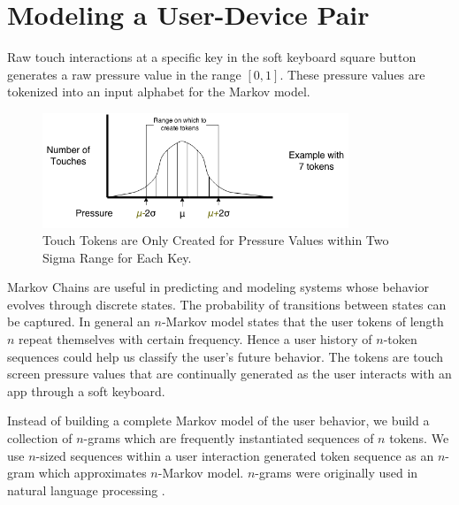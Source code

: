 \documentclass{acm_proc_article-sp}
\begin{document}
\section{Modeling a User-Device Pair}
\label{sec:modeling}
Raw touch interactions at a specific key in the soft keyboard square button
generates a raw pressure value in the range $[0,1]$. These pressure values are tokenized
into an input alphabet for the Markov model.
 
 \begin{figure}
\centering
\includegraphics[width=3.6in]{token_creation.png}
\caption{Touch Tokens are Only Created for Pressure Values within Two Sigma Range for Each Key.}
\label{fig:token_creation}
\end{figure}


Markov Chains are useful in predicting and modeling systems whose behavior evolves through discrete states. The probability of transitions between states can be captured.
In general an $n$-Markov model states that the
user tokens of length $n$ repeat themselves with certain frequency. Hence a user history
of $n$-token sequences could help us classify the user's future behavior. The tokens are
touch screen pressure values that are continually generated as the user interacts with an app
through a soft keyboard.


Instead of building a complete Markov model of the user behavior, we build a collection of $n$-grams
which are frequently instantiated sequences of $n$ tokens.
We use $n$-sized sequences  within a user interaction generated token sequence as an
$n$-gram which approximates $n$-Markov model. $n$-grams were originally
used in natural language processing \cite{Brown:ngram}.

\end{document}
